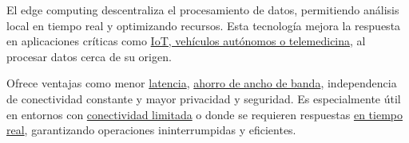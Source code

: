 

\begin{solution}
El edge computing descentraliza el procesamiento de datos, permitiendo análisis local en tiempo real y optimizando recursos. Esta tecnología mejora la respuesta en aplicaciones críticas como \ul{IoT, vehículos autónomos o telemedicina}, al procesar datos cerca de su origen.

Ofrece ventajas como menor \ul{latencia}, \ul{ahorro de ancho de banda}, independencia de conectividad constante y mayor privacidad y seguridad. Es especialmente útil en entornos con \ul{conectividad limitada} o donde se requieren respuestas \ul{en tiempo real}, garantizando operaciones ininterrumpidas y eficientes.

\end{solution}
